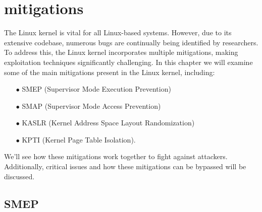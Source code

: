 \documentclass{report}
\begin{document}
    \section{mitigations}
    The Linux kernel is vital for all Linux-based systems. However, due to its extensive codebase, numerous bugs are continually being identified by researchers. To address this, the Linux kernel incorporates multiple mitigations, making exploitation techniques significantly challenging.\newline
    In this chapter we will examine some of the main mitigations present in the Linux kernel, including:
    \begin{itemize}
        \item[$\bullet$] SMEP (Supervisor Mode Execution Prevention)
        \item[$\bullet$] SMAP (Supervisor Mode Access Prevention) 
        \item[$\bullet$] KASLR (Kernel Address Space Layout Randomization)   
        \item[$\bullet$] KPTI (Kernel Page Table Isolation).\newline 
    \end{itemize}
    We'll see how these mitigations work together to fight against attackers.\newline
    Additionally, critical issues and how these mitigations can be bypassed will be discussed.\newline
    \subsection{SMEP}
\end{document}
